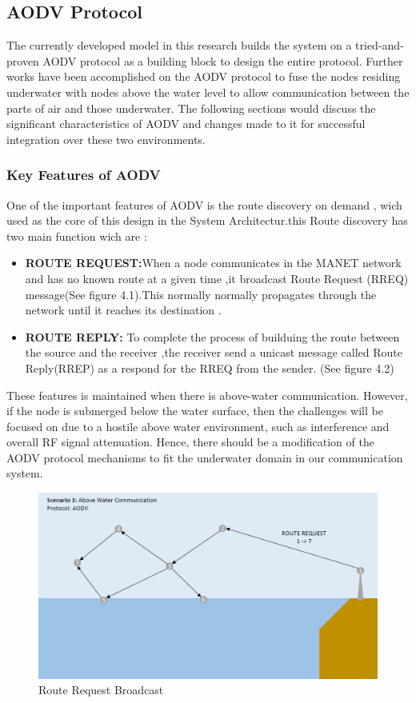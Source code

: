 \documentclass[]{nsm-thesis}
\begin{document}
\subsection{AODV Protocol}
The currently developed model in this research builds the system on a tried-and-proven AODV protocol as a building block to design the entire protocol. Further works have been accomplished on the AODV protocol to fuse the nodes residing underwater with nodes above the water level to allow communication between the parts of air and those underwater. The following sections would discuss the significant characteristics of AODV and changes made to it for successful integration over these two environments.
\subsubsection{Key Features of AODV}
One of the important features of AODV is the route discovery on demand , wich  used as the core of this design in the System Architectur.this Route discovery has two main function wich are :
\begin{itemize}
    \item \textbf{ROUTE REQUEST:}When a node communicates in the MANET network and has no known route at a given time ,it broadcast Route Request (RREQ) message(See figure 4.1).This normally normally propagates through the network until it reaches its destination .
    \item \textbf{ROUTE REPLY:} To complete the process of builduing the route between the source and the receiver ,the receiver send a unicast message called Route Reply(RREP) as a respond for the RREQ from the sender. (See figure 4.2)
\end{itemize}
These features is maintained when there is above-water communication. However, if the node is submerged below the water surface, then the challenges will be focused on due to a hostile above water environment, such as interference and overall RF signal attenuation. Hence, there should be a modification of the AODV protocol mechanisms to fit the underwater domain in our communication system.
\begin{figure}[h]
\graphicspath{{/image/}} %
\centering
\includegraphics[scale=0.5]{image/Scenario1.png} %
\caption{Route Request Broadcast}
\label{fig:mesh7} %
\end{figure}
\end{document}

